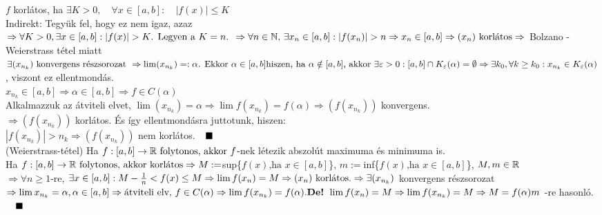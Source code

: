 \documentclass[a4paper,11pt]{article}
\begin{document}
\biz $f$ korlátos, ha $\exists K>0, \quad \forall x \in [a,b]: \quad |f(x)|\leq K$ \\[0.1cm]
Indirekt: Tegyük fel, hogy ez nem igaz, azaz\\[0.2cm]	
$\Rightarrow \forall K>0,\exists x \in[a,b]:|f(x)|> K\text{. Legyen a }K=n\text{. } 
\Rightarrow\forall n\in\N\text{, }\exists x_n\in[a,b]:|f(x_n)|>n\\[0.1cm] 
\Rightarrow x_n\in[a,b]\Rightarrow(x_n)\text{ korlátos}\Rightarrow$ Bolzano -
Weierstrass tétel miatt \\[0.1cm] $\exists(x_{n_k})\text{ konvergens részsorozat }
\Rightarrow\lim(x_{n_k})=:\alpha\text{. Ekkor }\alpha\in[a,b]\\[0.1cm]
\text{hiszen, ha }\alpha\notin[a,b]\text{, akkor }\exists\varepsilon>0:[a,b]\cap
K_\varepsilon(\alpha)=\emptyset\\[0.1cm]\Rightarrow\exists k_0,\forall k\geq k_0:
x_{n_k}\in K_\varepsilon(\alpha)$, viszont ez ellentmondás. \\[0.1cm]$x_{n_k}\in
[a,b]\Rightarrow\alpha\in[a,b]\Rightarrow f\in C(\alpha)$\\[0.1cm] Alkalmazzuk az
átviteli elvet, $\lim(x_{n_k})=\alpha\Rightarrow\lim f(x_{n_k})=f(\alpha)
\Rightarrow(f (x_{n_k}))$ konvergens. \\[0.1cm] $\Rightarrow(f (x_{n_k}))$
korlátos. És így ellentmondásra juttotunk, hiszen: \\[0.1cm] $|f(x_{n_k})|>n_k
\Rightarrow(f (x_{n_k}))$ nem korlátos.$\quad\blacksquare$\\[0.4cm]
\tetel (Weierstrass-tétel) Ha $ f:[a,b]\to\mathbb{R}\text{ folytonos, akkor } f$-nek
létezik abszolút maximuma és minimuma is.\\[0.1cm]
\biz Ha $ f:[a,b]\to\mathbb{R}\text{ folytonos, akkor korlátos} \\[0.1cm]\Rightarrow 
M:=$sup\{$f(x)\text{,ha } x\in[a,b]$\}, $m:=$inf\{$f(x)\text{,ha }x\in[a,b]$\},
$M,m\in\mathbb{R}$\\[0.1cm] $\Rightarrow\forall n\geq1$-re, $\exists x\in[a,b]:
M -\frac{1}{n}<f(x)\leq M\\[0.1cm]\Rightarrow\lim f(x_n)=M\Rightarrow(x_n)
\text{ korlátos.}\\[0.1cm]\Rightarrow\exists(x_{n_k})$ konvergens részsorozat$ 
\Rightarrow\lim x_{n_k}=\alpha,\alpha\in[a,b]\Rightarrow\text{átviteli elv, }
f\in C(\alpha)\\[0.1cm]\Rightarrow\lim f(x_{n_k})=f(\alpha).\\[0.1cm]
\text{\textbf{De!} }\lim f(x_n)=M\Rightarrow\lim f(x_{n_k})=M\Rightarrow
M=f(\alpha)\\[0.1cm]m$ -re hasonló.$\quad\blacksquare$
\end{document}
